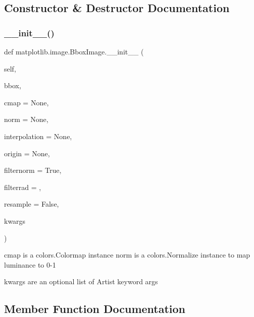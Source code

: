 \subsection{Constructor \& Destructor Documentation}
\mbox{\label{classmatplotlib_1_1image_1_1BboxImage_a953ed07bcfafce0d7fbd1572519a0fce}} 
\subsubsection{\texorpdfstring{\+\_\+\+\_\+init\+\_\+\+\_\+()}{\_\_init\_\_()}}
{\footnotesize\ttfamily def matplotlib.\+image.\+Bbox\+Image.\+\_\+\+\_\+init\+\_\+\+\_\+ (\begin{DoxyParamCaption}\item[{}]{self,  }\item[{}]{bbox,  }\item[{}]{cmap = {\ttfamily None},  }\item[{}]{norm = {\ttfamily None},  }\item[{}]{interpolation = {\ttfamily None},  }\item[{}]{origin = {\ttfamily None},  }\item[{}]{filternorm = {\ttfamily True},  }\item[{}]{filterrad = {},  }\item[{}]{resample = {\ttfamily False},  }\item[{}]{kwargs }\end{DoxyParamCaption})}

\begin{DoxyVerb}cmap is a colors.Colormap instance
norm is a colors.Normalize instance to map luminance to 0-1

kwargs are an optional list of Artist keyword args
\end{DoxyVerb}
 

\subsection{Member Function Documentation}
\mbox{\label{classmatplotlib_1_1image_1_1BboxImage_a1cad5391531e073d653b6806330bf864}} 
